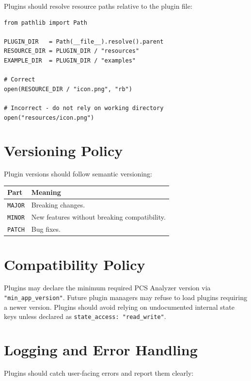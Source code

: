 \documentclass[11pt, a4paper]{article}
\begin{document}
Plugins should resolve resource paths relative to the plugin file:

\begin{lstlisting}[style=python]
from pathlib import Path

PLUGIN_DIR   = Path(__file__).resolve().parent
RESOURCE_DIR = PLUGIN_DIR / "resources"
EXAMPLE_DIR  = PLUGIN_DIR / "examples"

# Correct
open(RESOURCE_DIR / "icon.png", "rb")

# Incorrect - do not rely on working directory
open("resources/icon.png")
\end{lstlisting}

\section{Versioning Policy}

Plugin versions should follow semantic versioning:

\begin{tabularx}{\linewidth}{@{}M{3cm}L@{}}
  \toprule
  \textbf{Part} & \textbf{Meaning} \\
  \midrule
  \texttt{MAJOR} & Breaking changes. \\
  \texttt{MINOR} & New features without breaking compatibility. \\
  \texttt{PATCH} & Bug fixes. \\
  \bottomrule
\end{tabularx}

\section{Compatibility Policy}

Plugins may declare the minimum required PCS Analyzer version via \texttt{"min\_app\_version"}. Future plugin managers may refuse to load plugins requiring a newer version. Plugins should avoid relying on undocumented internal state keys unless declared as \texttt{state\_access: "read\_write"}.

\section{Logging and Error Handling}

Plugins should catch user-facing errors and report them clearly:
\end{document}
